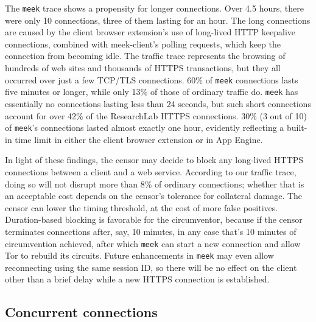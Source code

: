 \documentclass[conference]{IEEEtran}
\newcommand{\meekclient}{\mbox{meek-client}\xspace}
\newcommand{\meek}{\texttt{meek}\xspace}
\newcommand{\lbl}{ResearchLab\xspace}
\begin{document}
The \meek trace shows a propensity for longer connections.
Over 4.5 hours, there were only 10 connections,
three of them lasting for an hour.
The long connections are caused by the client browser extension's
use of long-lived HTTP keepalive connections,
combined with \meekclient's polling requests,
which keep the connection from becoming idle.
The traffic trace represents the browsing of hundreds of web sites
and thousands of HTTPS transactions, but they all
occurred over just a few TCP/TLS connections.
60\% of \meek connections lasts five minutes or longer,
while only 13\% of those of ordinary traffic do.
\meek has essentially no connections lasting less than 24 seconds,
but such short connections account for over 42\% of the \lbl HTTPS connections.
30\% (3 out of 10) of \meek's connections lasted almost exactly one hour,
evidently reflecting a built-in time limit in either the client browser extension
or in App Engine.

In light of these findings,
the censor may decide to block any long-lived HTTPS connections between
a client and a web service.
According to our traffic trace, doing so will not disrupt more than 8\% of ordinary connections;
whether that is an acceptable cost depends on the censor's
tolerance for collateral damage.
The censor can lower the timing threshold, at the cost of more false positives.
Duration-based blocking is favorable for the circumventor,
because if the censor terminates connections after, say, 10 minutes,
in any case that's 10 minutes of circumvention achieved,
after which \meek can start a new connection
and allow Tor to rebuild its circuits.
Future enhancements in \meek may even allow reconnecting using the same session ID,
so there will be no effect on the client other than a brief delay
while a new HTTPS connection is established.


\subsection{Concurrent connections}

\end{document}
